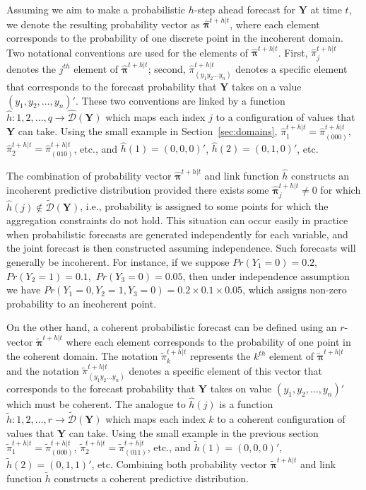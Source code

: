 \documentclass[a4paper,review,12pt,authoryear]{elsarticle}
\newcommand{\bY}{\mathbf{Y}}
\newcommand{\bpi}{\bm{\pi}}
\begin{document}
  \label{sec:coherent_df}

  Assuming we aim to make a probabilistic $h$-step ahead forecast for $\bY$ at time $t$, we denote the resulting probability vector as $\hat{\bpi}^{t+h|t}$, where each element corresponds to the probability of one discrete point in the incoherent domain. 
  Two notational conventions are used for the elements of $\hat{\bpi}^{t+h|t}$.
  First, $\hat{\pi}_j^{t+h|t}$ denotes the $j^{th}$ element of $\hat{\bpi}^{t+h|t}$;  
  second, $\hat{\pi}_{(y_1 y_2 \dots y_n)}^{t+h|t}$ denotes a specific element that corresponds to the forecast probability that $\bY$ takes on a value $(y_1,y_2,\dots,y_n)'$. These two conventions are linked by a function $\hat{h}:{1,2,\dots,q}\rightarrow\hat{\mathcal{D}}(\bY)$ which maps each index $j$ to a configuration of values that $\bY$ can take. 
  Using the small example in Section~\ref{sec:domains}, $\hat{\pi}_1^{t+h|t}=\hat{\pi}_{(000)}^{t+h|t}$, $\hat{\pi}_2^{t+h|t}=\hat{\pi}_{(010)}^{t+h|t}$, etc., and $\hat{h}(1)=(0,0,0)'$, $\hat{h}(2)=(0,1,0)'$, etc.
  
  The combination of probability vector $\hat{\bpi}^{t+h|t}$ and link function $\hat h$ constructs an incoherent predictive distribution provided there exists some $\hat{\bpi}^{t+h|t}_j\neq 0$ for which $\hat{h}(j)\notin\tilde{\mathcal{D}}(\bY)$, i.e., probability is assigned to some points for which the aggregation constraints do not hold. 
  This situation can occur easily in practice when probabilistic forecasts are generated independently for each variable, and the joint forecast is then constructed assuming independence. 
  Such forecasts will generally be incoherent. 
  For instance, if we suppose $Pr(Y_1=0)=0.2$,~$Pr(Y_2=1)=0.1$,~$Pr(Y_3=0)=0.05$, then under independence assumption we have $Pr(Y_1=0,Y_2=1,Y_3=0)=0.2\times0.1\times0.05$, which assigns non-zero probability to an incoherent point.
  
  On the other hand, a coherent probabilistic forecast can be defined using an $r$-vector $\tilde{\bpi}^{t+h|t}$ where each element corresponds to the probability of one point in the coherent domain. 
  The notation $\tilde{\pi}_k^{t+h|t}$ represents the $k^{th}$ element of $\tilde{\bpi}^{t+h|t}$ and the notation $\tilde{\pi}_{(y_1 y_2 \dots y_n)}^{t+h|t}$ denotes a specific element of this vector that corresponds to the forecast probability that $\bY$ takes on value $(y_1,y_2,\dots,y_n)'$ which must be coherent. 
  The analogue to $\hat{h}(j)$ is a function  $\tilde{h}:{1,2,\dots,r}\rightarrow\tilde{\mathcal{D}}(\bY)$ which maps each index $k$ to a coherent configuration of values that $\bY$ can take. 
  Using the small example in the previous section $\tilde{\pi}_1^{t+h|t}=\tilde{\pi}_{(000)}^{t+h|t}$, $\tilde{\pi}_2^{t+h|t}=\tilde{\pi}_{(011)}^{t+h|t}$, etc., and $\tilde{h}(1)=(0,0,0)'$, $\tilde{h}(2)=(0,1,1)'$, etc.
  Combining both probability vector $\tilde{\bpi}^{t+h|t}$ and link function $\tilde{h}$ constructs a coherent predictive distribution.
  
\end{document}
